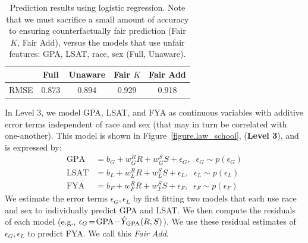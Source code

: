 \begin{table}
\centering
\caption{Prediction results using logistic regression. Note that we
  must sacrifice a small amount of accuracy to ensuring
  counterfactually fair prediction (Fair $K$, Fair Add), versus the
  models that use unfair features: GPA, LSAT, race, sex (Full,
  Unaware).} \label{table.pred_law}
\begin{tabular}{ccccc} 
\hline
 &  {\bf Full} & {\bf Unaware} & {\bf Fair $K$} & {\bf Fair Add} \\
\hline
RMSE & 0.873 & 0.894 & 0.929 & 0.918 \\
\hline
\end{tabular}
\end{table}

In Level 3, we model GPA, LSAT, and FYA as continuous variables with additive error terms independent of
race and sex (that may in turn be correlated with one-another). This model is shown in
Figure~\ref{figure.law_school}, (\textbf{Level 3}), and is expressed by: %
\begin{align}
\mbox{GPA} &= b_{G} + w_{G}^R R + w_{G}^S S + \epsilon_G, \;\; \epsilon_G \sim p(\epsilon_G) \nonumber \\
\mbox{LSAT} &= b_{L} + w_{L}^R R + w_{L}^S S + \epsilon_L, \;\; \epsilon_L \sim p(\epsilon_L) \nonumber \\
\mbox{FYA} &= b_{F} + w_{F}^R R + w_{F}^S S + \epsilon_F, \;\; \epsilon_F \sim p(\epsilon_F) \nonumber
\end{align}
We estimate the error terms $\epsilon_G,\epsilon_L$ by first fitting
two models that each use race and sex to individually predict GPA and
LSAT. We then compute the residuals of each model (e.g., $\epsilon_G
\!=\! \mbox{GPA} \!-\! \hat{Y}_{\scriptsize\mbox{GPA}}(R,S)$). We use
these residual estimates of $\epsilon_G,\epsilon_L$ to predict FYA. We
call this \emph{Fair Add}.





